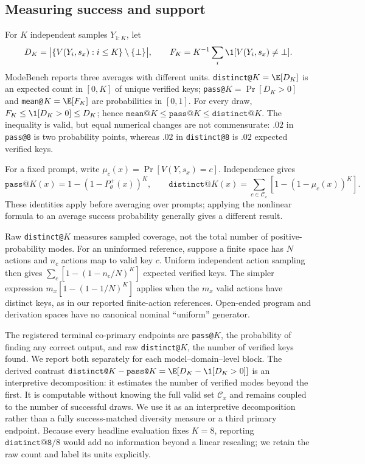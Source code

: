 \subsection{Measuring success and support}
\label{sec:collapse-metrics}

For $K$ independent samples $Y_{1:K}$, let
\[
  D_K=\bigl|\{V(Y_i,s_x):i\le K\}\setminus\{\bot\}\bigr|,
  \qquad
  F_K=K^{-1}\sum_i \1[V(Y_i,s_x)\neq\bot].
\]
ModeBench reports three averages with different units. \texttt{distinct@}$K
=\E[D_K]$ is an expected count in $[0,K]$ of unique verified keys;
\texttt{pass@}$K=\Pr[D_K>0]$ and \texttt{mean@}$K=\E[F_K]$ are probabilities
in $[0,1]$. For every draw, $F_K\le\1[D_K>0]\le D_K$; hence
$\texttt{mean@}K\le\texttt{pass@}K\le\texttt{distinct@}K$. The inequality is
valid, but equal numerical changes are not commensurate: $.02$ in
\texttt{pass@8} is two probability points, whereas $.02$ in
\texttt{distinct@8} is $.02$ expected verified keys.

For a fixed prompt, write $\mu_c(x)=\Pr[V(Y,s_x)=c]$. Independence gives
\[
 \texttt{pass@}K(x)=1-(1-P_\theta^+(x))^K,\qquad
 \texttt{distinct@}K(x)=\sum_{c\in\mathcal C_x}[1-(1-\mu_c(x))^K].
\]
These identities apply before averaging over prompts; applying the nonlinear
formula to an average success probability generally gives a different result.

Raw \texttt{distinct@}$K$ measures sampled coverage, not the total number of
positive-probability modes. For an uninformed reference, suppose a finite
space has $N$ actions and $n_c$ actions map to valid key $c$. Uniform independent
action sampling then gives $\sum_c[1-(1-n_c/N)^K]$ expected verified keys.
The simpler expression $m_x[1-(1-1/N)^K]$ applies when the $m_x$ valid actions
have distinct keys, as in our reported finite-action references.
Open-ended program and derivation spaces have no canonical nominal
``uniform'' generator.

The registered terminal co-primary endpoints are \texttt{pass@}$K$, the
probability of finding any correct output, and raw \texttt{distinct@}$K$, the
number of verified keys found. We report both separately for each
model--domain--level block. The derived contrast
$\texttt{distinct@}K-\texttt{pass@}K
=\E[D_K-\1[D_K>0]]$ is an interpretive decomposition: it estimates the
number of verified modes beyond the first. It is computable without knowing the
full valid set $\mathcal C_x$ and remains coupled to the number of successful
draws. We use it as an interpretive decomposition rather than a fully
success-matched diversity measure or a third primary endpoint. Because every
headline evaluation fixes $K=8$, reporting $\texttt{distinct@8}/8$ would add no
information beyond a linear rescaling; we retain the raw count and label its
units explicitly.

